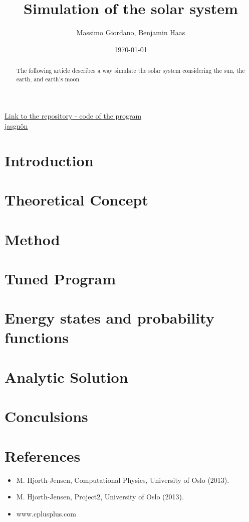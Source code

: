 \documentclass[a4paper]{article}
\title{\textbf{Simulation of the solar system}}
\author{Massimo Giordano, Benjamin Haas}
\date{\today}
\begin{document}
\maketitle
\begin{center}
\href{https://github.com/massimogiordano/repository/tree/master/restore_SOL/}{Link to the repository - code of the program\\jasgnön}
\end{center}

\begin{abstract}
The following article describes a way simulate the solar system considering the sun, the earth, and earth's moon. 
\end{abstract}
\tableofcontents
\pagebreak

\section{Introduction}

\section{Theoretical Concept}
 
\section{Method}

\section{Tuned Program}
\section{Energy states and probability functions}\label{2electrons}

\pagebreak
\section{Analytic Solution}

\pagebreak
\section{Conculsions}

\section{References}
\begin{itemize}
\item M. Hjorth-Jensen, 
Computational Physics, University of Oslo (2013).
\item M. Hjorth-Jensen, 
Project2, University of Oslo (2013).
\item www.cplusplus.com
\end{itemize}
\end{document}
